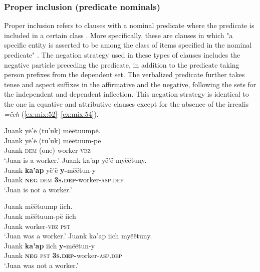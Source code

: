 \documentclass[output=paper,colorlinks,citecolor=brown,draft]{langscibook}
\begin{document}
\subsubsection{Proper inclusion (predicate nominals)}\label{sec:mix:2.3.3}

Proper inclusion refers to clauses with a nominal predicate where the predicate is included in a certain class \citep{Veselinova2013neg.exist}. More specifically, these are clauses in which "a specific entity is asserted to be among the class of items specified in the nominal predicate" \citep[114]{Payne1997}. The negation strategy used in these types of clauses includes the negative particle preceding the predicate, in addition to the predicate taking person prefixes from the dependent set. The verbalized predicate further takes tense and aspect suffixes in the affirmative and the negative, following the sets for the independent and dependent inflection. This negation strategy is identical to the one in equative and attributive clauses except for the absence of the irrealis \textit{=ëch} (\ref{ex:mix:52}--\ref{ex:mix:54}).
 
\ea\label{ex:mix:52}
    \ea\label{ex:mix:52a}
        \glll Juank yë’ë (tu’uk) mëëtuumpë.\\ 
              Juank yë’ë (tu’uk) mëëtuum-pë\\
              Juank \textsc{dem} (one) worker-\textsc{vbz}\\
        \glt ‘Juan is a worker.’    
    \ex\label{ex:mix:52b}
        \glll Juank ka’ap yë’ë myëëtuny.\\
              Juank \textbf{ka’ap} yë’ë \textbf{y-}mëëtun-y\\
              Juank \textbf{\textsc{neg}} \textsc{dem} \textbf{\textsc{3s.dep}}{}-worker-\textsc{asp.dep}\\
        \glt ‘Juan is not a worker.’
    \z
\z 
 
\ea\label{ex:mix:53}
    \ea\label{ex:mix:53a}
        \glll Juank mëëtuump iich.\\ 
              Juank mëëtuum-pë iich\\
              Juank worker-\textsc{vbz} \textsc{pst}\\
        \glt ‘Juan was a worker.’
    \ex\label{ex:mix:53b}
        \glll Juank ka’ap iich myëëtuny. \\
              Juank \textbf{ka’ap} iich \textbf{y-}mëëtun-y\\
              Juank \textbf{\textsc{neg}} \textsc{pst} \textbf{\textsc{3s.dep}}\textbf{{}-}worker-\textsc{asp.dep}\\
        \glt ‘Juan was not a worker.’
    \z
\z 
\end{document}
